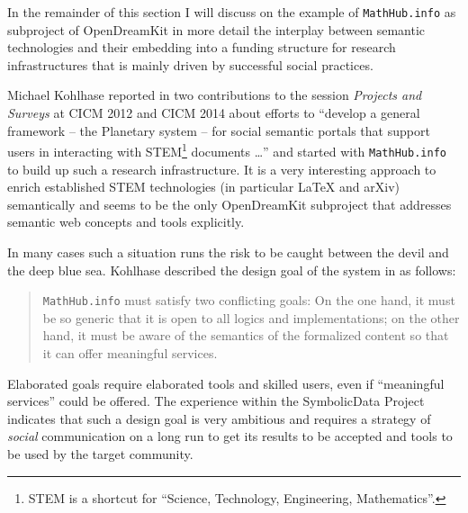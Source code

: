 \documentclass{llncs}
\newcommand{\SD}{{\sc Symbo\-lic\-Data}}
\begin{document}
In the remainder of this section I will discuss on the example of
\texttt{MathHub.info} as subproject of OpenDreamKit in more detail the
interplay between semantic technologies and their embedding into a funding
structure for research infra\-structures that is mainly driven by successful
social practices.

Michael Kohlhase reported in two contributions \cite{planetary,mathhub} to the
session \emph{Projects and Surveys} at CICM 2012 and CICM 2014 about efforts to
``develop a general framework -- the Planetary system -- for social semantic
portals that support users in interacting with STEM\footnote{STEM is a shortcut
  for ``Science, Technology, Engineering, Mathematics''.} documents {\ldots}''
\cite{planetary} and started with \texttt{MathHub.info} to build up such a
research infrastructure.  It is a very interesting approach to enrich
established STEM technologies (in particular {\LaTeX} and arXiv) semantically
and seems to be the only OpenDreamKit subproject that addresses semantic web
concepts and tools explicitly.

In many cases such a situation runs the risk to be caught between the devil and
the deep blue sea. Kohlhase described the design goal of the system in
\cite{mathhub} as follows:
\begin{quote}
  \texttt{MathHub.info} must satisfy two conflicting goals: On the one hand, it
  must be so generic that it is open to all logics and implementations; on the
  other hand, it must be aware of the semantics of the formalized content so
  that it can offer meaningful services. 
\end{quote}
Elaborated goals require elaborated tools and skilled users, even if
``meaningful services'' could be offered. The experience within the {\SD}
Project indicates that such a design goal is very ambitious and requires a
strategy of \emph{social} communication on a long run to get its results
to be accepted and tools to be used by the target community.
\end{document}
